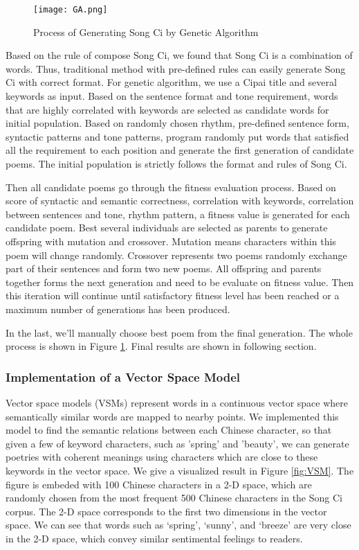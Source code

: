 \begin{figure}[htbp]
	\centering
	\texttt{[image: GA.png]}
	\caption{Process of Generating Song Ci by Genetic Algorithm}
	\label{fig:GA}
\end{figure}


Based on the rule of compose Song Ci, we found that Song Ci is a combination of words.
%
Thus, traditional method with pre-defined rules can easily generate Song Ci with correct format.
%
For genetic algorithm, we use a Cipai title and several keywords as input.
%
Based on the sentence format and tone requirement, words that are highly correlated with keywords are selected as candidate words for initial population.
%
Based on randomly chosen rhythm, pre-defined sentence form, syntactic patterns and tone patterns, program randomly put words that satisfied all the requirement to each position and generate the first generation of candidate poems.
%
The initial population is strictly follows the format and rules of Song Ci.


Then all candidate poems go through the fitness evaluation process.
%
Based on score of syntactic and semantic correctness, correlation with keywords, correlation between sentences and tone, rhythm pattern, a fitness value is generated for each candidate poem.
%
Best several individuals are selected as parents to generate offspring with mutation and crossover.
%
Mutation means characters within this poem will change randomly.
%
Crossover represents two poems randomly exchange part of their sentences and form two new poems.
%
All offspring and parents together forms the next generation and need to be evaluate on fitness value.
%
Then this iteration will continue until satisfactory fitness level has been reached or a maximum number of generations has been produced.


In the last, we'll manually choose best poem from the final generation.
%
The whole process is shown in Figure \ref{fig:GA}.
%
Final results are shown in following section.


\subsubsection{ Implementation of a Vector Space Model }
Vector space models (VSMs) represent words in a continuous vector space where semantically similar words are mapped to nearby points.
%
We implemented this model to find the semantic relations between each Chinese character, so that given a few of keyword characters, such as 'spring' and 'beauty', we can generate poetries with coherent meanings using characters which are close to these keywords in the vector space.
%
%
We give a visualized result in Figure \ref{fig:VSM}. The figure is embeded with 100 Chinese characters in a 2-D space, which are randomly chosen from the most frequent 500 Chinese characters in the Song Ci corpus. The 2-D space corresponds to the first two dimensions in the vector space. We can see that words such as `spring', `sunny', and `breeze' are very close in the 2-D space, which convey similar sentimental feelings to readers.



